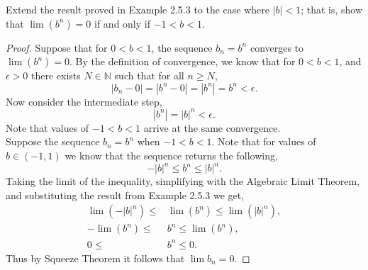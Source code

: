 \documentclass[12pt]{article}
\makeatletter
\theoremstyle{homework}
\newenvironment{exercise}[1]
{\def\@currentlabel{#1}\exercisecore}
{\endexercisecore}
\newcommand{\Nats}{\ensuremath{\mathbb N}}
\makeatother
\begin{document}
\begin{exercise}{2.5.7} Extend the result proved in Example 2.5.3 to the case where $|b|<1$; that is,
	show that $\lim(b^n) = 0$ if and only if $-1< b < 1$. \\
	\begin{proof}
		Suppose that for $0 < b < 1$, the sequence $b_n = b^n$ converges to $\lim(b^n) = 0$. By the definition of convergence, we know that for 
		$0 < b < 1$, and $\epsilon > 0$ there exists $N \in \Nats$ such that for all $n \geq N$,
		\begin{equation*}
			|b_n - 0| = |b^n - 0| = |b^n| = b^n < \epsilon.
		\end{equation*}
		Now consider the intermediate step,
		\begin{equation*}
			|b^n| = |b|^n< \epsilon.
		\end{equation*}
		Note that values of $-1< b < 1$ arrive at the same convergence.\\
		
		Suppose the sequence $b_n = b^n$ when $-1 < b < 1$. Note that for values of $b \in (-1,1)$ we know that the sequence returns the following,
		\begin{equation*}
			-|b|^n \leq b^n \leq |b|^n. 
		\end{equation*}
		Taking the limit of the inequality, simplifying with the Algebraic Limit Theorem, and substituting the result from Example 2.5.3 we get,
		\begin{align*}
			\lim(-|b|^n) \leq &\lim(b^n) \leq \lim(|b|^n),\\
			-\lim(b^n) \leq &b^n \leq \lim(b^n),\\
			0 \leq &b^n \leq 0.
		\end{align*}
Thus by Squeeze Theorem it follows that $\lim b_n = 0$. 
	\end{proof}

	
\end{exercise}

\vspace{.5in}
\end{document}
